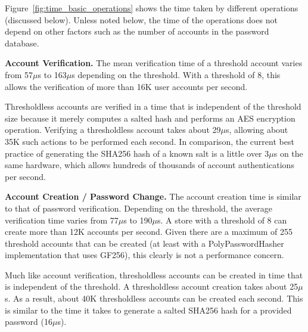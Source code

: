 Figure~\ref{fig:time_basic_operations} shows the time taken by
different operations (discussed below).  Unless noted below,
the time of the operations does not depend on other factors such as the 
number of accounts in the password database.




{\bf Account Verification.}
The mean verification time of a threshold account
varies from 57$\mu$s to 163$\mu$s depending on the
threshold.  With a threshold of 8, this allows the verification of 
more than 16K user accounts per second.

Thresholdless accounts are verified in a time that is independent
of the threshold size because it merely computes    
a salted hash and performs an AES encryption operation.
Verifying
a thresholdless account takes about 29$\mu$s, allowing
about 35K such actions to be performed each second.   
In comparison, the current
best practice of generating the SHA256 hash of a known salt is a little over
3$\mu$s on the same hardware, which allows hundreds of thousands of
account authentications per second.   



{\bf Account Creation / Password Change.}
The account creation time is similar to that of password verification.
Depending on the threshold, the average verification time 
varies from 77$\mu$s to 190$\mu$s.  
A store with a threshold of 8 can create more than 12K 
accounts per second.   Given there are a maximum of 255 threshold accounts
that can be created (at least with a PolyPasswordHasher implementation that uses
GF256), this clearly is not a performance concern.


Much like account verification, thresholdless accounts can be created in 
time that is independent of the threshold.   
A thresholdless account creation takes about 25$\mu$s.   As a result, 
about 40K thresholdless accounts can be created each second.   This is
similar to the time it takes to generate a salted SHA256 hash for a 
provided password (16$\mu$s). 


